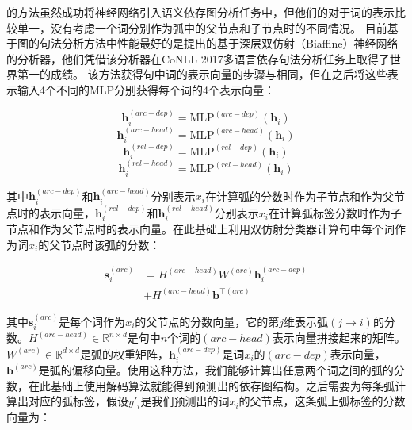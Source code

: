 的方法虽然成功将神经网络引入语义依存图分析任务中，但他们的对于词的表示比较单一，没有考虑一个词分别作为弧中的父节点和子节点时的不同情况。
目前基于图的句法分析方法中性能最好的是提出的基于深层双仿射（Biaffine）神经网络的分析器，他们凭借该分析器在CoNLL 2017多语言依存句法分析任务上取得了世界第一的成绩。
该方法获得句中词的表示向量的步骤与相同，但在之后将这些表示输入4个不同的MLP分别获得每个词的4个表示向量：

\begin{equation}
\label{eq:arc-dep}
\mathbf{h}^{(arc-dep)}_i = \text{MLP}^{(arc-dep)}(\mathbf{h}_i)
\end{equation}
\begin{equation}
\label{eq:arc-head}
\mathbf{h}^{(arc-head)}_i = \text{MLP}^{(arc-head)}(\mathbf{h}_i)
\end{equation}
\begin{equation}
\label{eq:rel-dep}
\mathbf{h}^{(rel-dep)}_i = \text{MLP}^{(rel-dep)}(\mathbf{h}_i)
\end{equation}
\begin{equation}
\label{eq:rel-head}
\mathbf{h}^{(rel-head)}_i = \text{MLP}^{(rel-head)}(\mathbf{h}_i)
\end{equation}

其中$\mathbf{h}^{(arc-dep)}_i$和$\mathbf{h}^{(arc-head)}_i$分别表示$x_i$在计算弧的分数时作为子节点和作为父节点时的表示向量，$\mathbf{h}^{(rel-dep)}_i$和$\mathbf{h}^{(rel-head)}_i$分别表示$x_i$在计算弧标签分数时作为子节点和作为父节点时的表示向量。在此基础上利用双仿射分类器计算句中每个词作为词$x_i$的父节点时该弧的分数：

\begin{equation}
\begin{split}
\mathbf{s}^{(arc)}_i & = H^{(arc-head)}W^{(arc)}\mathbf{h}^{(arc-dep)}_i \\
& + H^{(arc-head)}\mathbf{b}^{\top(arc)}
\end{split}
\end{equation}

其中$\mathbf{s}^{(arc)}_i$是每个词作为$x_i$的父节点的分数向量，它的第$j$维表示弧$(j\rightarrow i)$的分数。$H^{(arc-head)} \in \mathbb{R}^{n \times d}$是句中$n$个词的$(arc-head)$表示向量拼接起来的矩阵。$W^{(arc)} \in \mathbb{R}^{d \times d}$是弧的权重矩阵，$\mathbf{h}^{(arc-dep)}_i$是词$x_i$的$(arc-dep)$表示向量，$\mathbf{b}^{(arc)}$是弧的偏移向量。使用这种方法，我们能够计算出任意两个词之间的弧的分数，在此基础上使用解码算法就能得到预测出的依存图结构。之后需要为每条弧计算出对应的弧标签，假设$y'_i$是我们预测出的词$x_i$的父节点，这条弧上弧标签的分数向量为：

